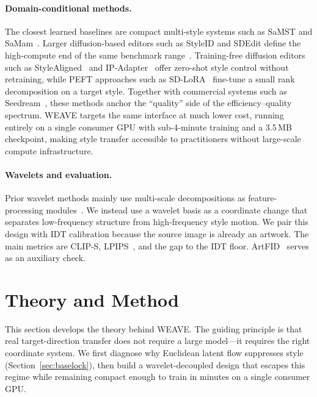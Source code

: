 \documentclass[letterpaper]{article}
\begin{document}
\paragraph{Domain-conditional methods.}
The closest learned baselines are compact multi-style systems such as SaMST and SaMam~\cite{liu2024samst,liu2024samam}.
Larger diffusion-based editors such as StyleID and SDEdit define the high-compute end of the same benchmark range~\cite{meng2021sdedit,chung2024styleid}.
Training-free diffusion editors such as StyleAligned~\cite{gal2022stylealigned} and IP-Adapter~\cite{ye2023ipadapter} offer zero-shot style control without retraining, while PEFT approaches such as SD-LoRA~\cite{hu2022lora} fine-tune a small rank decomposition on a target style.
Together with commercial systems such as Seedream~\cite{zhang2024artbank}, these methods anchor the ``quality'' side of the efficiency--quality spectrum.
WEAVE targets the same interface at much lower cost, running entirely on a single consumer GPU with sub-4-minute training and a 3.5\,MB checkpoint, making style transfer accessible to practitioners without large-scale compute infrastructure.

\paragraph{Wavelets and evaluation.}
Prior wavelet methods mainly use multi-scale decompositions as feature-processing modules~\cite{daubechies1992ten,phung2023wavelet}.
We instead use a wavelet basis as a coordinate change that separates low-frequency structure from high-frequency style motion.
We pair this design with IDT calibration because the source image is already an artwork.
The main metrics are CLIP-S, LPIPS~\cite{zhang2018lpips}, and the gap to the IDT floor.
ArtFID~\cite{wright2022artfid} serves as an auxiliary check.

\section{Theory and Method}
\label{sec:method}

This section develops the theory behind WEAVE. The guiding principle is that real target-direction transfer does not require a large model---it requires the right coordinate system. We first diagnose why Euclidean latent flow suppresses style (Section~\ref{sec:baselock}), then build a wavelet-decoupled design that escapes this regime while remaining compact enough to train in minutes on a single consumer GPU.
\end{document}
